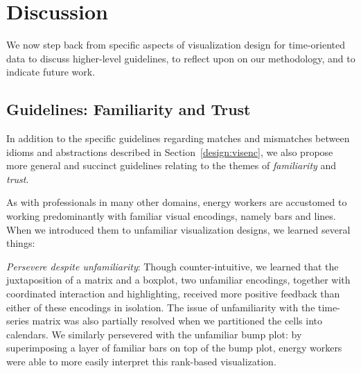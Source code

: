 \documentclass[journal]{vgtc}                %
\newcommand{\bstart}[1]{\vspace{1mm} \noindent{\textbf{#1:}}}
\begin{document}

\section{Discussion}
\label{discussion}


We now step back from specific aspects of visualization design for time-oriented data to discuss higher-level guidelines, to reflect upon on our methodology, and to indicate future work.


\subsection{Guidelines: Familiarity and Trust}
\label{discussion-guidelines}


In addition to the specific guidelines regarding matches and mismatches between idioms and abstractions described in Section~\ref{design:visenc}, we also propose more general and succinct guidelines relating to the themes of {\it familiarity} and {\it trust}.

\bstart{Familiarity} As with professionals in many other domains, energy workers are accustomed to working predominantly with familiar visual encodings, namely bars and lines.
When we introduced them to unfamiliar visualization designs, we learned several things:

{\it Persevere despite unfamiliarity}: Though counter-intuitive, we learned that the juxtaposition of a matrix and a boxplot, two unfamiliar encodings, together with coordinated interaction and highlighting, received more positive feedback than either of these encodings in isolation.
The issue of unfamiliarity with the time-series matrix was also partially resolved when we partitioned the cells into calendars.
We similarly persevered with the unfamiliar bump plot: by superimposing a layer of familiar bars on top of the bump plot, energy workers were able to more easily interpret this rank-based visualization.
\end{document}
